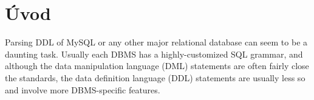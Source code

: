 \chapter{Úvod}

Parsing DDL of MySQL or any other major relational database can seem to be a daunting task. Usually each DBMS has a highly-customized SQL grammar, and although the data manipulation language (DML) statements are often fairly close the standards, the data definition language (DDL) statements are usually less so and involve more DBMS-specific features.

